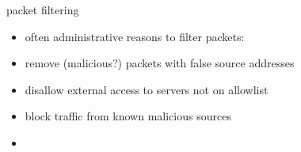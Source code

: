 \begin{frame}[label=pktFilterReasons]{packet filtering}
    \begin{itemize}
    \item often administrative reasons to filter packets:
    \vspace{.5cm}
    \item remove (malicious?) packets with false source addresses
    \item disallow external access to servers not on allowlist
    \item block traffic from known malicious sources
    \item 
    \end{itemize}
\end{frame}
